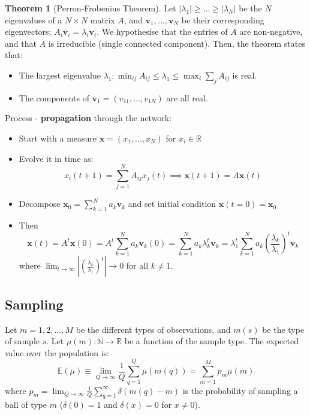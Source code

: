 \documentclass[12pt]{article}
\theoremstyle{definition}
\newtheorem{theorem}{Theorem}[section]
\begin{document}
\begin{theorem}[Perron-Frobenius Theorem]
    Let $|\lambda_1|\geq...\geq|\lambda_N|$ be the $N$ eigenvalues of a $N\times N$ matrix $A$, and $\boldsymbol{v}_1,...,\boldsymbol{v}_N$ be their corresponding eigenvectors: $A_i\boldsymbol{v}_i=\lambda_i\boldsymbol{v}_i$. We hypothesise that the entries of $A$ are non-negative, and that $A$ is irreducible (single connected component). Then, the theorem states that:
    \begin{itemize}
        \item The largest eigenvalue $\lambda_1: \min_{ij}A_{ij}\leq\lambda_1\leq\max_i\sum_jA_{ij}$ is real. 
        \item The components of $\boldsymbol{v}_1=(v_{11},...,v_{1N})$ are all real. 
    \end{itemize}
\end{theorem}

Process - \textbf{propagation} through the network: 
\begin{itemize}
    \item Start with a measure $\boldsymbol{x}=(x_1,...,x_{N})$ for $x_i\in\mathbb{R}$
    \item Evolve it in time as: 
    \[
    x_i(t+1)=\sum_{j=1}^NA_{ij}x_j(t)\implies \boldsymbol{x}(t+1)=A\boldsymbol{x}(t)
    \]
    \item Decompose $\boldsymbol{x}_0=\sum_{k=1}^Na_k\boldsymbol{v}_k$ and set initial condition $\boldsymbol{x}(t=0)=\boldsymbol{x}_0$
    \item Then
    \[
    \boldsymbol{x}(t)=A^t\boldsymbol{x}(0)=A^t\sum_{k=1}^Na_k\boldsymbol{v}_k(0)=\sum_{k=1}^Na_k\lambda_k^t\boldsymbol{v}_k=\lambda_1^t\sum_{k=1}^Na_k\left(\frac{\lambda_k}{\lambda_1}\right)^t\boldsymbol{v}_k
    \]
    where $\lim_{t\rightarrow\infty}\left|\left(\frac{\lambda_k}{\lambda_1}\right)^t\right|\rightarrow 0$ for all $k\neq 1$. 
\end{itemize}

\subsection{Sampling}

Let $m=1,2,...,M$ be the different types of observations, and $m(s)$ be the type of sample $s$. Let $\mu(m):\mathbb{N}\rightarrow\mathbb{R}$ be a function of the sample type. The expected value over the population is:
\[
\mathbb E(\mu) \equiv \lim_{Q\rightarrow\infty}\frac{1}{Q}\sum_{q=1}^Q\mu(m(q))=\sum_{m=1}^M p_m\mu(m)
\]
where $p_m=\lim_{Q\to\infty}\frac{1}{Q}\sum_{q=1}^\infty \delta(m(q)-m)$ is the probability of sampling a ball of type $m$ ($\delta(0)=1$ and $\delta(x)=0$ for $x\neq 0$). 
\end{document}

